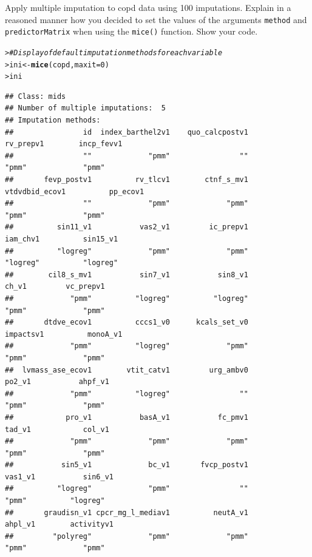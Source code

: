\documentclass[a4paper,10pt]{article}\usepackage[]{graphicx}\usepackage[]{xcolor}
\makeatletter
\newcommand{\hlnum}[1]{\textcolor[rgb]{0.686,0.059,0.569}{#1}}%
\newcommand{\hlcom}[1]{\textcolor[rgb]{0.678,0.584,0.686}{\textit{#1}}}%
\newcommand{\hldef}[1]{\textcolor[rgb]{0.345,0.345,0.345}{#1}}%
\newcommand{\hlkwb}[1]{\textcolor[rgb]{0.69,0.353,0.396}{#1}}%
\newcommand{\hlkwc}[1]{\textcolor[rgb]{0.333,0.667,0.333}{#1}}%
\newcommand{\hlkwd}[1]{\textcolor[rgb]{0.737,0.353,0.396}{\textbf{#1}}}%
\newenvironment{kframe}{%
 \def\at@end@of@kframe{}%
 \ifinner\ifhmode%
  \def\at@end@of@kframe{\end{minipage}}%
  \begin{minipage}{\columnwidth}%
 \fi\fi%
 \def\FrameCommand##1{\hskip\@totalleftmargin \hskip-\fboxsep
 \colorbox{shadecolor}{##1}\hskip-\fboxsep
     \hskip-\linewidth \hskip-\@totalleftmargin \hskip\columnwidth}%
 \MakeFramed {\advance\hsize-\width
   \@totalleftmargin\z@ \linewidth\hsize
   \@setminipage}}%
 {\par\unskip\endMakeFramed%
 \at@end@of@kframe}
\newenvironment{knitrout}{}{} %
\makeatother
\begin{document}
Apply multiple imputation to copd data using 100 imputations. Explain in a reasoned manner how you decided to set the values of the arguments \texttt{method} and \texttt{predictorMatrix} when using the \texttt{mice()} function. Show your code.

\begin{knitrout}\footnotesize
{}\color{fgcolor}\begin{kframe}
\begin{alltt}
\hldef{> }\hlcom{# Display of default imputation methods for each variable}
\hldef{> }\hldef{ini} \hlkwb{<-} \hlkwd{mice}\hldef{(copd,} \hlkwc{maxit}\hldef{=}\hlnum{0}\hldef{)}
\hldef{> }\hldef{ini}
\end{alltt}
\begin{verbatim}
## Class: mids
## Number of multiple imputations:  5 
## Imputation methods:
##                id  index_barthel2v1    quo_calcpostv1         rv_prepv1        incp_fevv1 
##                ""             "pmm"                ""             "pmm"             "pmm" 
##       fevp_postv1          rv_tlcv1        ctnf_s_mv1    vtdvdbid_ecov1          pp_ecov1 
##                ""             "pmm"             "pmm"             "pmm"             "pmm" 
##          sin11_v1           vas2_v1         ic_prepv1          iam_chv1          sin15_v1 
##          "logreg"             "pmm"             "pmm"          "logreg"          "logreg" 
##        cil8_s_mv1           sin7_v1           sin8_v1             ch_v1         vc_prepv1 
##             "pmm"          "logreg"          "logreg"             "pmm"             "pmm" 
##       dtdve_ecov1          cccs1_v0      kcals_set_v0         impactsv1          monoA_v1 
##             "pmm"          "logreg"             "pmm"             "pmm"             "pmm" 
##  lvmass_ase_ecov1        vtit_catv1         urg_ambv0            po2_v1           ahpf_v1 
##             "pmm"          "logreg"                ""             "pmm"             "pmm" 
##            pro_v1           basA_v1           fc_pmv1            tad_v1            col_v1 
##             "pmm"             "pmm"             "pmm"             "pmm"             "pmm" 
##           sin5_v1             bc_v1       fvcp_postv1           vas1_v1           sin6_v1 
##          "logreg"             "pmm"                ""             "pmm"          "logreg" 
##       graudisn_v1 cpcr_mg_l_mediav1          neutA_v1           ahpl_v1        activityv1 
##         "polyreg"             "pmm"             "pmm"             "pmm"             "pmm" 

\end{verbatim}
\end{kframe}
\end{knitrout}
\end{document}

